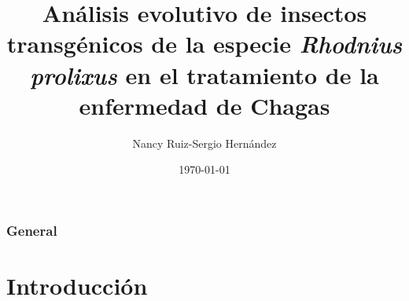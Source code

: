 \documentclass{beamer}
\title[]{Análisis evolutivo de insectos transgénicos de la especie \textit{Rhodnius prolixus} en el tratamiento de la enfermedad de Chagas } %
\author{Nancy Ruiz-Sergio Hernández} %
\institute[Uniandes] %
{
Universidad de los Andes \\ %
}
\date{\today} %
\begin{document}
\begin{frame}
\titlepage %
\end{frame}

\begin{frame}
\frametitle{General} %
\tableofcontents %
\end{frame}


\section{Introducción} %




















\end{document}
